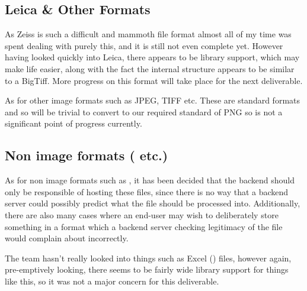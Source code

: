\subsection{Leica \& Other Formats}
As Zeiss is such a difficult and mammoth file format almost all of my time was spent dealing with purely this,
and it is still not even complete yet. However having looked quickly into Leica, there appears to be
library support, which may make life easier, along with the fact the internal structure appears to be similar to
a BigTiff. More progress on this format will take place for the next deliverable.

As for other image formats such as JPEG, TIFF etc. These are standard formats and so will be trivial to
convert to our required standard of PNG so is not a significant point of progress currently.

\subsection{Non image formats ( etc.)}
As for non image formats such as , it has been decided that the backend should only be responsible of hosting these
files, since there is no way that a backend server could possibly predict what the file should be processed into.
Additionally, there are also many cases where an end-user may wish to deliberately store something in a format
which a backend server checking legitimacy of the file would complain about incorrectly.

The team hasn't really looked into things such as Excel () files, however again, pre-emptively looking, there seems to
be fairly wide library support for things like this, so it was not a major concern for this deliverable.
